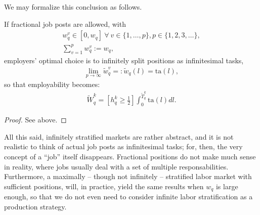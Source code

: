 \documentclass[hidelinks, nonatbib]{elsarticle}
\begin{document}
We may formalize this conclusion as follows.
\begin{lemma}
    \label{isl}
    If fractional job posts are allowed, with
    \begin{gather}
        w_{q}^{v} 
        \in 
        [0, w_q]
        \
        \forall
        \
        v \in \{1, \dots, p\}
        ,
        p \in \{1, 2, 3, \dots\}
        ,
        \\
        \sum_{v=1}^{p}
        w_{q}^{v}
        :=
        w_q
        ,
        \end{gather}
        employers' optimal choice is to infinitely split positions as infinitesimal tasks,
        \begin{gather}
            \lim_{p \rightarrow \infty}{
                \tilde{w}_{q}^{v}
            }
            =:
            \tilde{w}_{q}(l)
            =
            \text{ta}(l)
            ,
            \end{gather}
            so that employability becomes:
            \begin{gather}
                \tilde{W}_{q}^{k} 
                = 
                \left[
                    h_{q}^{k}
                    \geq
                    \frac{1}{2}
                \right]
                \int_{0}^{\tilde{T}_{q}^{k}}
                \text{ta}(l)
                dl
                .
                \end{gather}
    \begin{proof}
        See above.
    \end{proof}
\end{lemma}

All this said, infinitely stratified markets are rather abstract, and it is not realistic to think of actual job posts as infinitesimal tasks; for, then, the very concept of a ``job'' itself disappears. Fractional positions do not make much sense in reality, where jobs usually deal with a set of multiple responsabilities. Furthermore, a maximally -- though not infinitely -- stratified labor market with sufficient positions, will, in practice, yield the same results when $w_q$ is large enough, so that we do not even need to consider infinite labor stratification as a production strategy.
\end{document}
